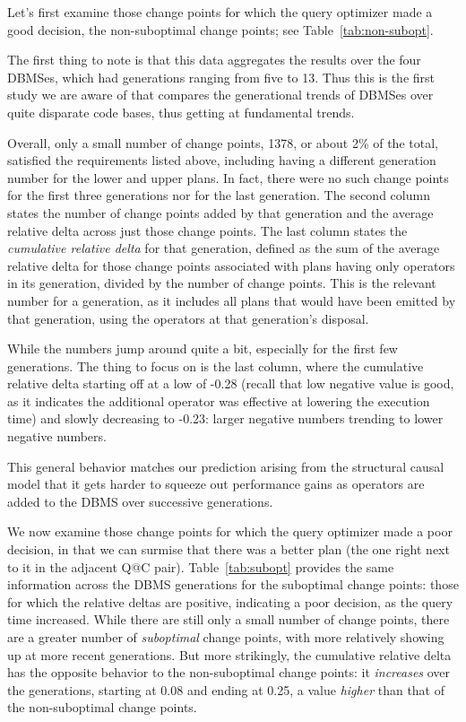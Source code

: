 \documentclass[prodmode,acmtods]{acmsmall}
\begin{document}
Let's first examine those change points for which the query optimizer made a
good decision, the non-suboptimal change points; see
Table~\ref{tab:non-subopt}.

The first thing to note is that this data aggregates the results over the
four \hbox{DBMSes}, which had generations ranging from five to 13. Thus this is the
first study we are aware of that compares the generational trends of \hbox{DBMSes}
over quite disparate code bases, thus getting at fundamental trends.

Overall, only a small number of change points, 1378, or about 2\% of the
total, satisfied the requirements listed above, including having a different
generation number for the lower and upper plans. In fact, there were no such
change points for the first three generations nor for the last
generation. The second column states the number of change points added by
that generation and the average relative delta across just those change
points. The last column states the {\em cumulative relative delta} for that
generation, defined as
the sum of the average relative delta for those change points associated
with plans having only operators in its generation, divided by the number of
change points. This is the relevant number for a generation, as it includes
all plans that would have been emitted by that generation, using the
operators at that generation's disposal.

While the numbers jump around quite a bit, especially for the first few
generations. The thing to focus on is the last column, where the cumulative
relative delta starting off at a low of
-0.28 (recall that low negative value is good, as it indicates the
additional operator was effective at lowering the execution time) and slowly decreasing to -0.23:
larger negative numbers trending to lower negative
numbers.

This general behavior matches our prediction arising from the structural causal model that it
gets harder to squeeze out performance gains as operators are added to the
\hbox{DBMS} over successive generations.

We now examine those change points for which the query optimizer made a poor
decision, in that we can surmise that there was a better plan (the one right
next to it in the adjacent Q@C pair). Table~\ref{tab:subopt} provides the
same information across the \hbox{DBMS} generations for the suboptimal change
points: those for which the
  relative deltas are positive, indicating a poor decision, as the query
  time increased. While there are
  still only a small number of change points, there are a greater number of
  {\em suboptimal} change points, with more relatively showing up at more
  recent generations. But more strikingly, the cumulative relative delta has
  the opposite behavior to the non-suboptimal change points: it {\em
    increases} over the generations, starting at 0.08 and ending at 0.25, a
  value {\em higher} than that of the non-suboptimal change points.
\end{document}

